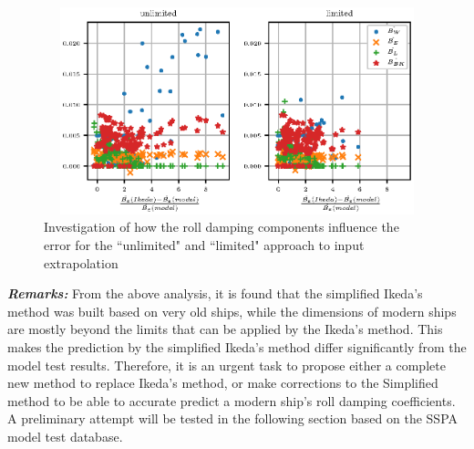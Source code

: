 \begin{figure}[H]
\vspace{-0.5cm}
\centering
  \centering
  \includegraphics[height=6cm, width = 14cm]{figures/ikeda_components.eps}
  \vspace{-0.5cm}
  \caption{Investigation of how the roll damping components influence the error for the ``unlimited" and ``limited" approach to input extrapolation}
  \label{fig:ikeda_components}
\end{figure}

\textbf{\textit{Remarks:}} From the above analysis, it is found that the simplified Ikeda's method was built based on very old ships, while the dimensions of modern ships are mostly beyond the limits that can be applied by the Ikeda's method. This makes the prediction by the simplified Ikeda's method differ significantly from the model test results.
Therefore, it is an urgent task to propose either a complete new method to replace Ikeda's method, or make corrections to the Simplified method to be able to accurate predict a modern ship's roll damping coefficients. A preliminary attempt will be tested in the following section based on the SSPA model test database.
